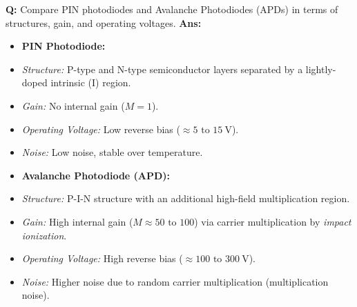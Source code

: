 \documentclass[10pt,a4paper,twocolumn]{article}
\begin{document}
\begin{tcolorbox}[
  colback=white,
  colframe=UnitColorFour,
  colbacktitle=gray!10!white,
  coltitle=black,
  fonttitle=\bfseries\sffamily\small,
  title={Unit IV $\bullet$ Card 3: PIN vs. APD Photodetector},
  boxrule=1.2pt,
  arc=2mm,
  outer arc=2mm,
  boxsep=1.5mm,
  top=1mm,
  bottom=1mm,
  left=1.5mm,
  right=1.5mm,
  before skip=2.5mm,
  after skip=2.5mm
]
\textbf{Q:} Compare PIN photodiodes and Avalanche Photodiodes (APDs) in terms of structures, gain, and operating voltages.
\tcbline
\textbf{Ans:} \begin{itemize}
  \item   \textbf{PIN Photodiode:}
  \item   \textit{Structure:} P-type and N-type semiconductor layers separated by a lightly-doped intrinsic (I) region.
  \item   \textit{Gain:} No internal gain ($M = 1$).
  \item   \textit{Operating Voltage:} Low reverse bias ($\approx 5 \text{ to } 15\ \text{V}$).
  \item   \textit{Noise:} Low noise, stable over temperature.
  \item   \textbf{Avalanche Photodiode (APD):}
  \item   \textit{Structure:} P-I-N structure with an additional high-field multiplication region.
  \item   \textit{Gain:} High internal gain ($M \approx 50 \text{ to } 100$) via carrier multiplication by \textit{impact ionization}.
  \item   \textit{Operating Voltage:} High reverse bias ($\approx 100 \text{ to } 300\ \text{V}$).
  \item   \textit{Noise:} Higher noise due to random carrier multiplication (multiplication noise).
\end{itemize}
\end{tcolorbox}
\end{document}
